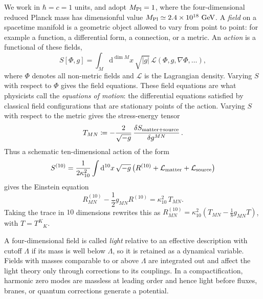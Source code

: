 We work in $\hbar = c = 1$ units, and adopt $M_{\mathrm{Pl}} = 1$, where the
four-dimensional reduced Planck mass has dimensionful value
$M_{\mathrm{Pl}} \simeq 2.4\times 10^{18}~\mathrm{GeV}$.
A \emph{field} on a spacetime manifold is a geometric object allowed
to vary from point to point: for example a function, a differential
form, a connection, or a metric. An \emph{action} is a functional of
these fields,
\begin{equation}
    S[\Phi,g] = \int_M \mathrm{d}^{\dim M}x\,
        \sqrt{|g|}\,\mathcal{L}(\Phi,g,\nabla\Phi,\ldots),
\end{equation}
where $\Phi$ denotes all non-metric fields and $\mathcal{L}$ is the
Lagrangian density. Varying $S$ with respect to $\Phi$ gives the
field equations. These field equations are what physicists call the
\emph{equations of motion}: the differential equations satisfied by
classical field configurations that are stationary points of the
action. Varying $S$ with respect to the metric gives the stress-energy
tensor
\begin{equation}\label{eq:stress-tensor-def}
    T_{MN}
    \coloneqq  
    -\frac{2}{\sqrt{-g}}\,
    \frac{\delta S_{\rm matter+source}}{\delta g^{MN}} \, .
\end{equation}
Thus a schematic ten-dimensional action of the form
\begin{equation}
    S^{(10)}
    =
    \frac{1}{2\kappa_{10}^2}
    \int \mathrm{d}^{10}x\,\sqrt{-g}\,
        \bigl(R^{(10)}+\mathcal{L}_{\rm matter}
        +\mathcal{L}_{\rm source}\bigr)
\end{equation}
gives the Einstein equation
\begin{equation}\label{eq:einstein-stress-convention}
    R^{(10)}_{MN} - \frac12 g_{MN}R^{(10)}
        = \kappa_{10}^2\,T_{MN}.
\end{equation}
Taking the trace in $10$ dimensions rewrites this as
$R^{(10)}_{MN}=\kappa_{10}^2(T_{MN}-\tfrac18 g_{MN}T)$, with
$T=T^K{}_K$.

A four-dimensional field is called \emph{light} relative to an
effective description with cutoff $\Lambda$ if its mass is well below
$\Lambda$, so it is retained as a dynamical variable. Fields with
masses comparable to or above $\Lambda$ are integrated out and affect
the light theory only through corrections to its couplings. In a
compactification, harmonic zero modes are massless at leading order
and hence light before fluxes, branes, or quantum corrections generate
a potential.

